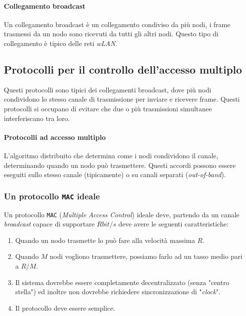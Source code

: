         \paragraph{Collegamento broadcast} Un collegamento broadcast è un collegamento condiviso da più nodi, i frame trasmessi da un nodo sono ricevuti da tutti gli altri nodi. Questo tipo di collegamento è tipico delle reti \textit{wLAN}.
    \subsection{Protocolli per il controllo dell'accesso multiplo}
        Questi protocolli sono tipici dei collegamenti broadcast, dove più nodi condividono lo stesso canale di trasmissione per inviare e ricevere frame. Questi protocolli si occupano di evitare che due o più trasmissioni simultanee interferiscano tra loro.
        \paragraph{Protocolli ad accesso multiplo} L'algoritmo distribuito che determina come i nodi condividono il canale, determinando quando un nodo può trasmettere. Questi accordi possono essere eseguiti sullo stesso canale (tipicamente) o su canali separati (\textit{out-of-band}).
        \subsubsection{Un protocollo \texttt{MAC} ideale}
            Un protocollo \texttt{MAC} (\textit{Multiple Access Control}) ideale deve, partendo da un canale \textit{broadcast} capace di supportare $R bit/s$ deve avere le seguenti caratteristiche:
            \begin{enumerate}
                \item Quando un nodo trasmette lo può fare alla velocità massima $R$.
                \item Quando $M$ nodi vogliono trasmettere, possiamo farlo ad un tasso medio pari a $R/M$.
                \item Il sistema dovrebbe essere completamente decentralizzato (senza "centro stella") ed inoltre non dovrebbe richiedere sincronizzazione di "\textit{clock}".
                \item Il protocollo deve essere semplice.
            \end{enumerate}
